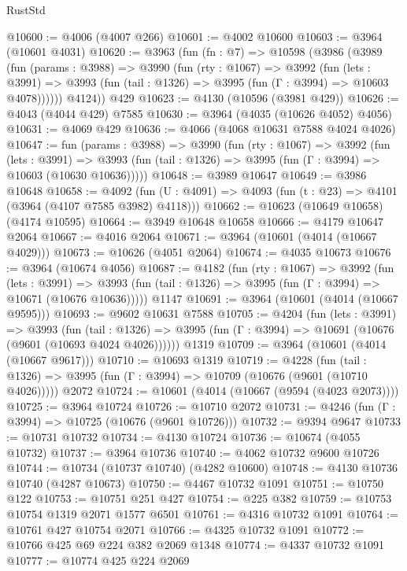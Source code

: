 \begin{lexlean}{RustStd}
\begin{coremodule}
@10600 := @4006 (@4007 @266)
@10601 := @4002 @10600
@10603 := @3964 (@10601 @4031)
@10620 := @3963
    (fun (fn : @7) =>
    @10598
      (@3986
        (@3989
          (fun (params : @3988) =>
          @3990
            (fun (rty : @1067) =>
            @3992
              (fun (lets : @3991) =>
              @3993 (fun (tail : @1326) => @3995 (fun (Γ : @3994) => @10603 @4078))))))
        @4124))
    @429
@10623 := @4130 (@10596 (@3981 @429))
@10626 := @4043 (@4044 @429) @7585
@10630 := @3964 (@4035 (@10626 @4052) @4056)
@10631 := @4069 @429
@10636 := @4066 (@4068 @10631 @7588 @4024 @4026)
@10647 := fun (params : @3988) =>
  @3990
    (fun (rty : @1067) =>
    @3992
      (fun (lets : @3991) =>
      @3993 (fun (tail : @1326) => @3995 (fun (Γ : @3994) => @10603 (@10630 @10636)))))
@10648 := @3989 @10647
@10649 := @3986 @10648
@10658 := @4092
    (fun (U : @4091) => @4093 (fun (t : @23) => @4101 (@3964 (@4107 @7585 @3982) @4118)))
@10662 := @10623 (@10649 @10658) (@4174 @10595)
@10664 := @3949 @10648 @10658
@10666 := @4179 @10647 @2064
@10667 := @4016 @2064
@10671 := @3964 (@10601 (@4014 (@10667 @4029)))
@10673 := @10626 (@4051 @2064)
@10674 := @4035 @10673
@10676 := @3964 (@10674 @4056)
@10687 := @4182
    (fun (rty : @1067) =>
    @3992
      (fun (lets : @3991) =>
      @3993 (fun (tail : @1326) => @3995 (fun (Γ : @3994) => @10671 (@10676 @10636)))))
    @1147
@10691 := @3964 (@10601 (@4014 (@10667 @9595)))
@10693 := @9602 @10631 @7588
@10705 := @4204
    (fun (lets : @3991) =>
    @3993
      (fun (tail : @1326) =>
      @3995 (fun (Γ : @3994) => @10691 (@10676 (@9601 (@10693 @4024 @4026))))))
    @1319
@10709 := @3964 (@10601 (@4014 (@10667 @9617)))
@10710 := @10693 @1319
@10719 := @4228
    (fun (tail : @1326) => @3995 (fun (Γ : @3994) => @10709 (@10676 (@9601 (@10710 @4026)))))
    @2072
@10724 := @10601 (@4014 (@10667 (@9594 (@4023 @2073))))
@10725 := @3964 @10724
@10726 := @10710 @2072
@10731 := @4246 (fun (Γ : @3994) => @10725 (@10676 (@9601 @10726)))
@10732 := @9394 @9647
@10733 := @10731 @10732
@10734 := @4130 @10724
@10736 := @10674 (@4055 @10732)
@10737 := @3964 @10736
@10740 := @4062 @10732 @9600 @10726
@10744 := @10734 (@10737 @10740) (@4282 @10600)
@10748 := @4130 @10736 @10740 (@4287 @10673)
@10750 := @4467 @10732 @1091
@10751 := @10750 @122
@10753 := @10751 @251 @427
@10754 := @225 @382
@10759 := @10753 @10754 @1319 @2071 @1577 @6501
@10761 := @4316 @10732 @1091
@10764 := @10761 @427 @10754 @2071
@10766 := @4325 @10732 @1091
@10772 := @10766 @425 @69 @224 @382 @2069 @1348
@10774 := @4337 @10732 @1091
@10777 := @10774 @425 @224 @2069

\end{coremodule}
\end{lexlean}
